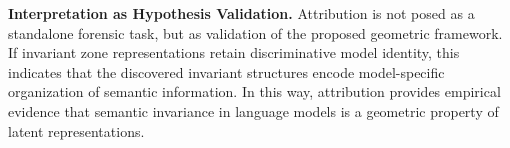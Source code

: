 \textbf{Interpretation as Hypothesis Validation.}
Attribution is not posed as a standalone forensic task, but as validation of the proposed geometric framework. If invariant zone representations retain discriminative model identity, this indicates that the discovered invariant structures encode model-specific organization of semantic information. In this way, attribution provides empirical evidence that semantic invariance in language models is a geometric property of latent representations.
